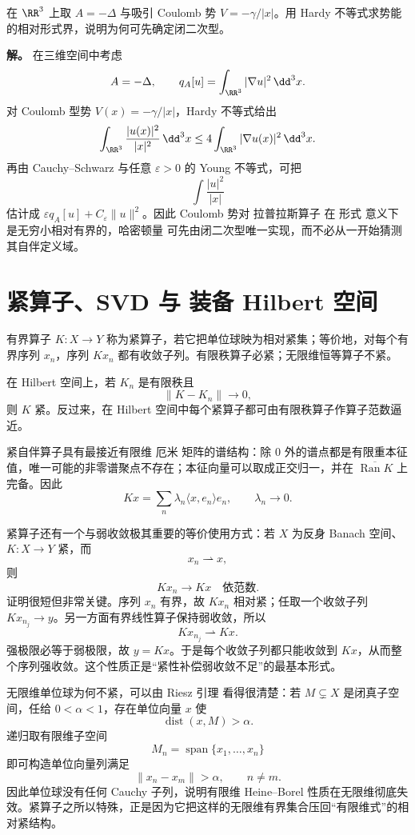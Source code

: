 \begin{exbox}
在 $\RR^3$ 上取 $A=-\Delta$ 与吸引 Coulomb 势 $V=-\gamma/|x|$。用 Hardy 不等式求势能的相对形式界，说明为何可先确定闭二次型。

\textbf{解。} 在三维空间中考虑
\[
A=-\Delta,
\qquad
q_A[u]=\int_{\RR^3}|\nabla u|^2\,\dd^3x.
\]
对 Coulomb 型势 $V(x)=-\gamma/|x|$，Hardy 不等式给出
\[
\int_{\RR^3}\frac{|u(x)|^2}{|x|^2}\,\dd^3x
\le 4\int_{\RR^3}|\nabla u(x)|^2\,\dd^3x.
\]
再由 Cauchy--Schwarz 与任意 $\varepsilon>0$ 的 Young 不等式，可把
\[
\int\frac{|u|^2}{|x|}
\]
估计成 $\varepsilon q_A[u]+C_\varepsilon\|u\|^2$。因此 Coulomb 势对 拉普拉斯算子 在 形式 意义下是无穷小相对有界的，哈密顿量 可先由闭二次型唯一实现，而不必从一开始猜测其自伴定义域。
\end{exbox}

\section{紧算子、SVD 与 装备 Hilbert 空间}
有界算子 $K:X\to Y$ 称为紧算子，若它把单位球映为相对紧集；等价地，对每个有界序列 $x_n$，序列 $Kx_n$ 都有收敛子列。有限秩算子必紧；无限维恒等算子不紧。

在 Hilbert 空间上，若 $K_n$ 是有限秩且
\[
\|K-K_n\|\to0,
\]
则 $K$ 紧。反过来，在 Hilbert 空间中每个紧算子都可由有限秩算子作算子范数逼近。

紧自伴算子具有最接近有限维 厄米 矩阵的谱结构：除 $0$ 外的谱点都是有限重本征值，唯一可能的非零谱聚点不存在；本征向量可以取成正交归一，并在 $\overline{\operatorname{Ran}K}$ 上完备。因此
\[
{Kx=\sum_n\lambda_n\langle x,e_n\rangle e_n},
\qquad \lambda_n\to0.
\]

紧算子还有一个与弱收敛极其重要的等价使用方式：若 $X$ 为反身 Banach 空间、$K:X\to Y$ 紧，而
\[
x_n\rightharpoonup x,
\]
则
\begin{equation*}Kx_n\to Kx
\quad\text{依范数}.\end{equation*}
证明很短但非常关键。序列 $x_n$ 有界，故 $Kx_n$ 相对紧；任取一个收敛子列 $Kx_{n_j}\to y$。另一方面有界线性算子保持弱收敛，所以
\[
Kx_{n_j}\rightharpoonup Kx.
\]
强极限必等于弱极限，故 $y=Kx$。于是每个收敛子列都只能收敛到 $Kx$，从而整个序列强收敛。这个性质正是“紧性补偿弱收敛不足”的最基本形式。

无限维单位球为何不紧，可以由 Riesz 引理 看得很清楚：若 $M\subsetneq X$ 是闭真子空间，任给 $0<\alpha<1$，存在单位向量 $x$ 使
\[
\operatorname{dist}(x,M)>\alpha.
\]
递归取有限维子空间
\[
M_n=\operatorname{span}\{x_1,\ldots,x_n\}
\]
即可构造单位向量列满足
\[
\|x_n-x_m\|>\alpha,
\qquad n\neq m.
\]
因此单位球没有任何 Cauchy 子列，说明有限维 Heine--Borel 性质在无限维彻底失效。紧算子之所以特殊，正是因为它把这样的无限维有界集合压回“有限维式”的相对紧结构。

